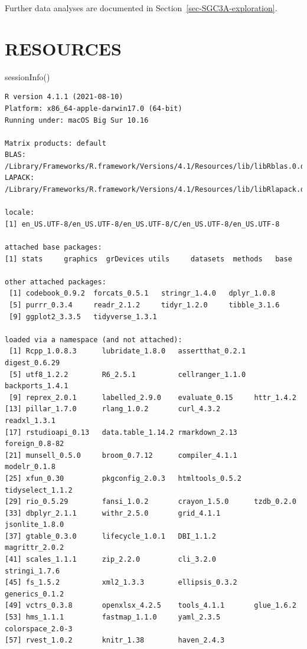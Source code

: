 \documentclass[
  letterpaper,
  DIV=11,
  numbers=noendperiod]{scrreprt}
\newenvironment{Shaded}{\begin{snugshade}}{\end{snugshade}}
\newcommand{\FunctionTok}[1]{\textcolor[rgb]{0.28,0.35,0.67}{#1}}
\newcommand{\NormalTok}[1]{\textcolor[rgb]{0.00,0.23,0.31}{#1}}
\begin{document}
Further data analyses are documented in
Section~\ref{sec-SGC3A-exploration}.

\hypertarget{resources}{%
\section{RESOURCES}\label{resources}}

\begin{Shaded}
\begin{Highlighting}[]
\FunctionTok{sessionInfo}\NormalTok{()}
\end{Highlighting}
\end{Shaded}

\begin{verbatim}
R version 4.1.1 (2021-08-10)
Platform: x86_64-apple-darwin17.0 (64-bit)
Running under: macOS Big Sur 10.16

Matrix products: default
BLAS:   /Library/Frameworks/R.framework/Versions/4.1/Resources/lib/libRblas.0.dylib
LAPACK: /Library/Frameworks/R.framework/Versions/4.1/Resources/lib/libRlapack.dylib

locale:
[1] en_US.UTF-8/en_US.UTF-8/en_US.UTF-8/C/en_US.UTF-8/en_US.UTF-8

attached base packages:
[1] stats     graphics  grDevices utils     datasets  methods   base     

other attached packages:
 [1] codebook_0.9.2  forcats_0.5.1   stringr_1.4.0   dplyr_1.0.8    
 [5] purrr_0.3.4     readr_2.1.2     tidyr_1.2.0     tibble_3.1.6   
 [9] ggplot2_3.3.5   tidyverse_1.3.1

loaded via a namespace (and not attached):
 [1] Rcpp_1.0.8.3      lubridate_1.8.0   assertthat_0.2.1  digest_0.6.29    
 [5] utf8_1.2.2        R6_2.5.1          cellranger_1.1.0  backports_1.4.1  
 [9] reprex_2.0.1      labelled_2.9.0    evaluate_0.15     httr_1.4.2       
[13] pillar_1.7.0      rlang_1.0.2       curl_4.3.2        readxl_1.3.1     
[17] rstudioapi_0.13   data.table_1.14.2 rmarkdown_2.13    foreign_0.8-82   
[21] munsell_0.5.0     broom_0.7.12      compiler_4.1.1    modelr_0.1.8     
[25] xfun_0.30         pkgconfig_2.0.3   htmltools_0.5.2   tidyselect_1.1.2 
[29] rio_0.5.29        fansi_1.0.2       crayon_1.5.0      tzdb_0.2.0       
[33] dbplyr_2.1.1      withr_2.5.0       grid_4.1.1        jsonlite_1.8.0   
[37] gtable_0.3.0      lifecycle_1.0.1   DBI_1.1.2         magrittr_2.0.2   
[41] scales_1.1.1      zip_2.2.0         cli_3.2.0         stringi_1.7.6    
[45] fs_1.5.2          xml2_1.3.3        ellipsis_0.3.2    generics_0.1.2   
[49] vctrs_0.3.8       openxlsx_4.2.5    tools_4.1.1       glue_1.6.2       
[53] hms_1.1.1         fastmap_1.1.0     yaml_2.3.5        colorspace_2.0-3 
[57] rvest_1.0.2       knitr_1.38        haven_2.4.3      
\end{verbatim}
\end{document}
